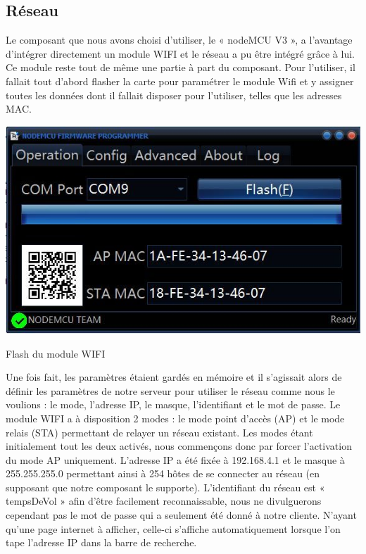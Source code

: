 \subsection{Réseau}
Le composant que nous avons choisi d’utiliser, le « nodeMCU V3 », a l’avantage d’intégrer directement un module WIFI et le réseau a pu être intégré grâce à lui. Ce module reste tout de même une partie à part du composant. Pour l’utiliser, il fallait tout d’abord flasher la carte pour paramétrer le module Wifi et y assigner toutes les données dont il fallait disposer pour l’utiliser, telles que les adresses MAC.
\begin{center}
    \includegraphics[scale=0.4]{photoHugo/image001}
    
    Flash du module WIFI
\end{center}
Une fois fait, les paramètres étaient gardés en mémoire et il s’agissait alors de définir les paramètres de notre serveur pour utiliser le réseau comme nous le voulions : le mode, l’adresse IP, le masque, l’identifiant et le mot de passe. Le module WIFI a à disposition 2 modes : le mode point d’accès (AP) et le mode relais (STA) permettant de relayer un réseau existant. Les modes étant initialement tout les deux activés, nous commençons donc par forcer l’activation du mode AP uniquement. L’adresse IP a été fixée à 192.168.4.1 et le masque à 255.255.255.0 permettant ainsi à 254 hôtes de se connecter au réseau (en supposant que notre composant le supporte). L’identifiant du réseau est « tempsDeVol » afin d’être facilement reconnaissable, nous ne divulguerons cependant pas le mot de passe qui a seulement été donné à notre cliente. N’ayant qu’une page internet à afficher, celle-ci s’affiche automatiquement lorsque l’on tape l’adresse IP dans la barre de recherche.
